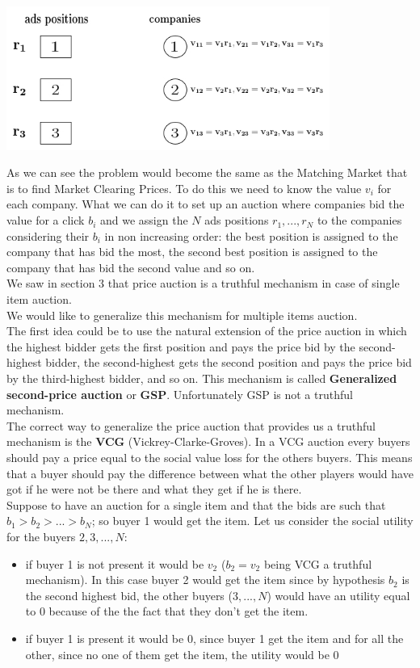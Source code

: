 \documentclass{article}
\begin{document}
\centerline{
\includegraphics[width=300pt]{img14.jpg}}

As we can see the problem would become the same as the Matching Market that is to find Market Clearing Prices. To do this we need to know the value $v_i$ for each company. What we can do it to set up an auction where companies bid the value for a click $b_i$ and we assign the $N$ ads positions $r_1,...,r_N$ to the companies considering their $b_i$ in non increasing order: the best position is assigned to the company that has bid the most, the second best position is assigned to the company that has bid the second value and so on.\\
We saw in section 3 that  price auction is a truthful mechanism in case of single item auction.\\
We would like to generalize this mechanism for multiple items auction.\\
The first idea could be to use the natural extension of the  price auction in which the highest bidder gets the first position and pays the price bid by the second-highest bidder, the second-highest gets the second position and pays the price bid by the third-highest bidder, and so on. This mechanism is called \textbf{Generalized second-price auction} or \textbf{GSP}. Unfortunately GSP is not a truthful mechanism.\\
The correct way to generalize the  price auction that provides us a truthful mechanism is the \textbf{VCG} (Vickrey-Clarke-Groves). In a VCG auction every buyers should pay a price equal to the social value loss for the others buyers. This means that a buyer should pay the difference between what the other players would have got if he were not be there and what they  get if he is there.\\
Suppose to have an auction for a single item and that the bids are such that $b_1>b_2>...>b_N$; so buyer 1 would get the item. Let us consider the social utility for the buyers $2,3,...,N$: 
\begin{itemize}
	\item if buyer 1 is not present it would be $v_2$ ($b_2=v_2$ being VCG a truthful mechanism). In this case buyer 2 would get the item since by hypothesis $b_2$ is the second highest bid, the other buyers ($3,...,N$) would have an utility equal to $0$ because of the the fact that they don't get the item. 
	\item if buyer 1 is present it would be 0, since buyer 1 get the item and for all the other, since no one of them get the item, the utility would be $0$ 
\end{itemize}
\end{document}
